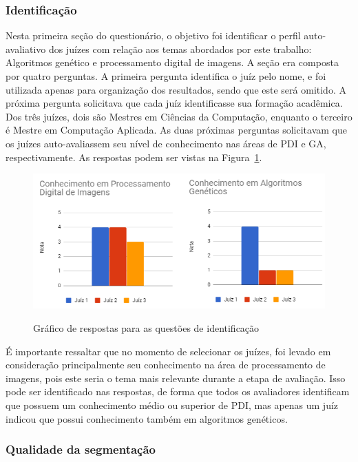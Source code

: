\documentclass[12pt,oneside,a4paper,english,french,spanish,brazil,]{abntex2}
\begin{document}
\subsubsection{Identificação}

Nesta primeira seção do questionário, o objetivo foi identificar o perfil auto-avaliativo dos juízes com relação aos temas abordados por este trabalho: Algoritmos genético e processamento digital de imagens. A seção era composta por quatro perguntas. A primeira pergunta identifica o juíz pelo nome, e foi utilizada apenas para organização dos resultados, sendo que este será omitido. A próxima pergunta solicitava que cada juíz identificasse sua formação acadêmica. Dos três juízes, dois são Mestres em Ciências da Computação, enquanto o terceiro é Mestre em Computação Aplicada. As duas próximas perguntas solicitavam que os juízes auto-avaliassem seu nível de conhecimento nas áreas de PDI e GA, respectivamente. As respostas podem ser vistas na Figura~\ref{fig:AJ_Perfil}.

\begin{figure}[ht]
\centering
\caption{Gráfico de respostas para as questões de identificação}
\includegraphics[width=1.0\textwidth]{imagens/Avaliacao_Juizes/Grafico_Perfil.png}
\sourceAuthor{}
\label{fig:AJ_Perfil}
\end{figure}

É importante ressaltar que no momento de selecionar os juízes, foi levado em consideração principalmente seu conhecimento na área de processamento de imagens, pois este seria o tema mais relevante durante a etapa de avaliação. Isso pode ser identificado nas respostas, de forma que todos os avaliadores identificam que possuem um conhecimento médio ou superior de PDI, mas apenas um juíz indicou que possui conhecimento também em algoritmos genéticos.

\subsubsection{Qualidade da segmentação}
\end{document}

